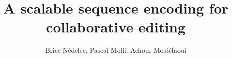 \documentclass[times]{cpeauth}
\begin{document}
\title{A scalable sequence encoding for collaborative editing}

\author{Brice N{\'e}delec\corrauth, Pascal Molli\corrauth, Achour
  Most{\'e}faoui\corrauth}

\address{\centering%
  LINA, 2 rue de la Houssini{\`e}re,\\
  BP92208, 44322 Nantes Cedex 03, France\\
  \url{first.last@univ-nantes.fr}
}






\maketitle














\end{document}
